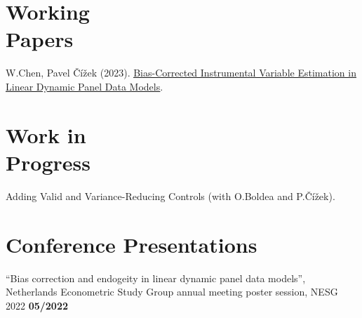 \documentclass[margin,line]{res}
\newenvironment{list2}{
  \begin{list}{$\bullet$}{%
      \setlength{\itemsep}{0in}
      \setlength{\parsep}{0in} \setlength{\parskip}{0in}
      \setlength{\topsep}{0in} \setlength{\partopsep}{0in} 
      \setlength{\leftmargin}{0.2in}}}{\end{list}}
\begin{document}
\begin{resume}
\section{\sc Working \\ Papers}
W.Chen, Pavel \v{C}\'{i}\v{z}ek (2023). \href{https://pure.uvt.nl/ws/portalfiles/portal/82271980/2023-028.pdf}{\uline{Bias-Corrected Instrumental Variable Estimation in Linear Dynamic Panel Data Models}}.



\section{\sc Work in \\ Progress}
Adding Valid and Variance-Reducing Controls (with O.Boldea and P.\v{C}\'{i}\v{z}ek).

%

\section{\sc Conference Presentations}
``Bias correction and endogeity in linear dynamic panel data models'', 
Netherlands Econometric Study Group annual meeting poster session, NESG 2022 \hfill {\bf 05/2022}
\vspace{-.3cm}



\end{resume}
\end{document}
